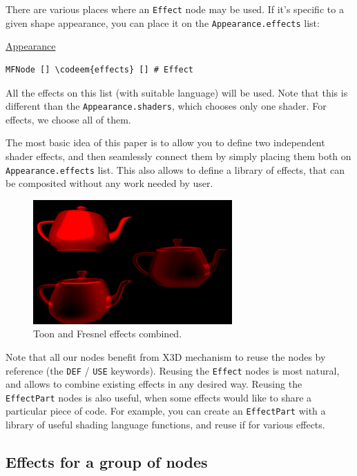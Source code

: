 \documentclass{acmsiggraph}                     %
\newenvironment{mycode}
{\begin{mycodecore}}
{\end{mycodecore}
\vspace{-0.1in}}
\newcommand*{\codeem}[1]{\textbf{#1}}
\begin{document}
There are various places where an \texttt{Effect} node may be used.
If it's specific to a given shape appearance, you can place it
on the \texttt{Appearance.effects} list:

\begin{mycode}
\underline{Appearance}
\begin{Verbatim}[commandchars=\\\{\}]
MFNode [] \codeem{effects} [] # Effect
\end{Verbatim}
\end{mycode}

All the effects on this list (with suitable language) will be used.
Note that this is different
than the \texttt{Appearance.shaders}, which chooses only one shader.
For effects, we choose all of them.

The most basic idea of this paper is to allow you to define two
independent shader effects, and then seamlessly connect them by simply
placing them both on \texttt{Appearance.effects} list. This also allows to
define a library of effects, that can be composited without any work
needed by user.

\begin{figure}[H]
  \centering
  \includegraphics[width=3in]{fresnel_and_toon}
  \caption{Toon and Fresnel effects combined.}
\end{figure}

Note that all our nodes benefit from X3D mechanism to reuse the nodes
by reference (the \texttt{DEF} / \texttt{USE} keywords). Reusing the
\texttt{Effect} nodes
is most natural, and allows to combine existing effects in any desired way.
Reusing the \texttt{EffectPart} nodes is also useful, when some effects
would like to share a particular piece of code. For example,
you can create an \texttt{EffectPart} with a library of useful
shading language functions, and reuse if for various effects.

\subsection{Effects for a group of nodes}
\end{document}
